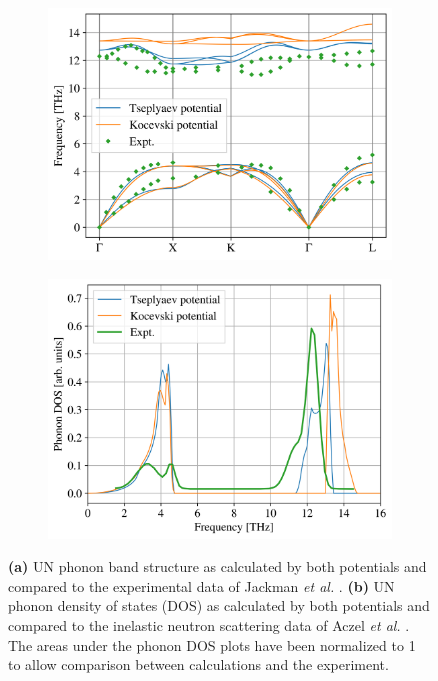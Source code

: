 \documentclass[preprint, 12pt]{elsarticle}
\providecommand{\DIFaddend}{} %
\DeclareRobustCommand{\DIFaddend}{\DIFOaddend \let\includegraphics\DIFOincludegraphics} %
\begin{document}
\DIFaddend \begin{figure}[h!]
\centering
\begin{subfigure}{0.45\textwidth}
    \includegraphics[width=\textwidth]{PBS.png}
    \caption{}
    \label{Fig:PBS}
\end{subfigure}
\hfill
\begin{subfigure}{0.45\textwidth}
    \includegraphics[width=\textwidth]{PDOS.png}
    \caption{}
    \label{Fig:PDOS}
\end{subfigure}
\caption{\textbf{(a)} UN phonon band structure as calculated by both potentials and compared to the experimental data of Jackman \textit{et al.} \cite{Jackman1986}. \textbf{(b)} UN phonon density of states (DOS) as calculated by both potentials and compared to the inelastic neutron scattering data of Aczel \textit{et al.} \cite{Aczel2012}. The areas under the phonon DOS plots have been normalized to 1 to allow comparison between calculations and the experiment.}
\label{Fig:Phonons}
\end{figure}
\end{document}
